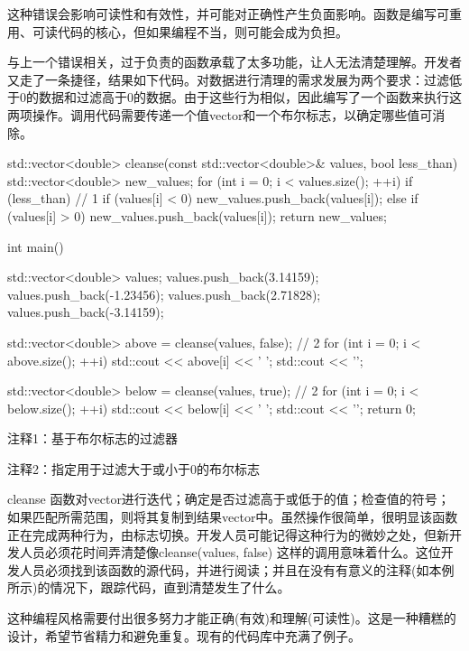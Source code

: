 这种错误会影响可读性和有效性，并可能对正确性产生负面影响。函数是编写可重用、可读代码的核心，但如果编程不当，则可能会成为负担。


与上一个错误相关，过于负责的函数承载了太多功能，让人无法清楚理解。开发者又走了一条捷径，结果如下代码。对数据进行清理的需求发展为两个要求：过滤低于0的数据和过滤高于0的数据。由于这些行为相似，因此编写了一个函数来执行这两项操作。调用代码需要传递一个值vector和一个布尔标志，以确定哪些值可消除。


\begin{cpp}
std::vector<double> cleanse(const std::vector<double>& values,
    bool less_than) {
  std::vector<double> new_values;
  for (int i = 0; i < values.size(); ++i)
    if (less_than) { // 1
      if (values[i] < 0)
        new_values.push_back(values[i]);
    } else
        if (values[i] > 0)
          new_values.push_back(values[i]);
  return new_values;
}

int main() {
  std::vector<double> values;
  values.push_back(3.14159);
  values.push_back(-1.23456);
  values.push_back(2.71828);
  values.push_back(-3.14159);

  std::vector<double> above = cleanse(values, false); // 2
  for (int i = 0; i < above.size(); ++i)
    std::cout << above[i] << ' ';
  std::cout << '\n';

  std::vector<double> below = cleanse(values, true); // 2
  for (int i = 0; i < below.size(); ++i)
    std::cout << below[i] << ' ';
  std::cout << '\n';
  return 0;
}
\end{cpp}

{\footnotesize
注释1：基于布尔标志的过滤器

注释2：指定用于过滤大于或小于0的布尔标志
}


cleanse 函数对vector进行迭代；确定是否过滤高于或低于的值；检查值的符号；如果匹配所需范围，则将其复制到结果vector中。虽然操作很简单，很明显该函数正在完成两种行为，由标志切换。开发人员可能记得这种行为的微妙之处，但新开发人员必须花时间弄清楚像cleanse(values, false) 这样的调用意味着什么。这位开发人员必须找到该函数的源代码，并进行阅读；并且在没有有意义的注释(如本例 所示)的情况下，跟踪代码，直到清楚发生了什么。

这种编程风格需要付出很多努力才能正确(有效)和理解(可读性)。这是一种糟糕的设计，希望节省精力和避免重复。现有的代码库中充满了例子。

